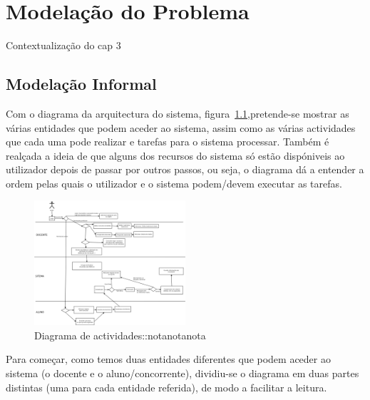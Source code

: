 \newcommand{\rarrow}{\rightarrow}
\newcommand{\larrow}{\leftarrow}
\newcommand{\unif}{\sim}
\def\prop#1#2#3{\noindent\\$\begin{array}{l} \{#1\} \\ #2 \\ \{#3\} \\ \end{array}$\\\\}

\chapter{Modelação do Problema} \label{chap modprob}

Contextualização do cap 3

\section{Modelação Informal}\label{sec modinf}
Com o diagrama da arquitectura do sistema, figura~\ref{fig diaact},pretende-se mostrar as várias entidades que podem aceder ao sistema, assim como as várias
actividades que cada uma pode realizar e tarefas para o sistema processar.
Também é realçada a ideia de que alguns dos recursos do sistema só estão dispóniveis ao utilizador depois 
de passar por outros passos, ou seja, o diagrama dá a entender a ordem pelas quais o utilizador e o sistema podem/devem executar as tarefas.\\

\begin{figure}[htbp]
\begin{center}
\includegraphics[width=0.5\textwidth]{Images/EL-PI}
\caption{Diagrama de actividades::notanotanota}\label{fig diaact}
\end{center}
\end{figure}

Para começar, como temos duas entidades diferentes que podem aceder ao sistema (o docente e o aluno/concorrente), 
dividiu-se o diagrama em duas partes distintas (uma para cada entidade referida), de modo a facilitar a leitura.\\

